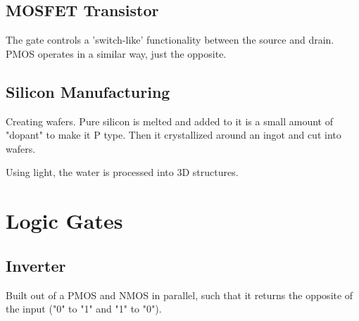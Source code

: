 \documentclass[00_complete]{subfiles}
\begin{document}
\subsection{MOSFET Transistor}
The gate controls a 'switch-like' functionality between the source and drain.
PMOS operates in a similar way, just the opposite.
\subsection{Silicon Manufacturing}
Creating wafers. Pure silicon is melted and added to it is a small amount of
"dopant" to make it P type. Then it crystallized around an ingot and cut into
wafers.

Using light, the water is processed into 3D structures.
\section{Logic Gates}
\subsection{Inverter}
Built out of a PMOS and NMOS in parallel, such that it returns the opposite
of the input ("0" to "1" and "1" to "0").
\end{document}
